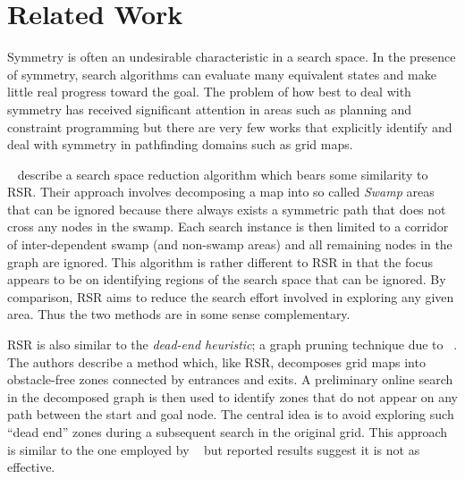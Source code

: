 \section{Related Work}
\label{sec:relatedwork}
Symmetry is often an undesirable characteristic in a search space.
In the presence of symmetry, search algorithms can evaluate many equivalent
states and make little real progress toward the goal.
The problem of how best to deal with symmetry has received significant attention 
in areas such as planning \cite{fox99} and constraint programming \cite{gent00} 
but there are very few works that explicitly identify and deal with symmetry in 
pathfinding domains such as grid maps. 
\par
\citeauthor{pochter10}~ describe a search space
reduction algorithm which bears some similarity to RSR.
Their approach involves decomposing a map into so called \emph{Swamp} areas that can
be ignored because there always exists a symmetric path that does not cross any
nodes in the swamp. Each search instance is then limited to a corridor of
inter-dependent swamp (and non-swamp areas) and all remaining nodes in the graph
are ignored. This algorithm is rather different to RSR in that the focus appears
to be on identifying regions of the search space that can be ignored.  
By comparison, RSR aims to reduce the search effort involved in exploring any
given area. Thus the two methods are in some sense complementary.
\par
RSR is also similar to the \emph{dead-end heuristic}; a graph pruning
technique due to \citeauthor{bjornsson06}~.
The authors describe a method which, like RSR, decomposes grid maps into
obstacle-free zones connected by entrances and exits.  A preliminary online
search in the decomposed graph is then used to identify zones that do not appear
on any path between the start and goal node. The central idea is to avoid
exploring such ``dead end'' zones during a subsequent search in the original grid. 
This approach is similar to the one employed by
\citeauthor{pochter10}~ but reported results suggest it is
not as effective.

